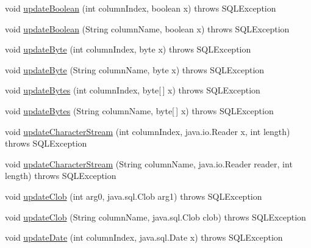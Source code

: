 \begin{DoxyCompactItemize}
void \mbox{\hyperlink{classcom_1_1mysql_1_1cj_1_1jdbc_1_1result_1_1_result_set_impl_a771a72e5c06a9b65546cfbf374addb5d}{update\+Boolean}} (int column\+Index, boolean x)  throws S\+Q\+L\+Exception 
\item 
void \mbox{\hyperlink{classcom_1_1mysql_1_1cj_1_1jdbc_1_1result_1_1_result_set_impl_ae8c78aad2e4078932d6153efecb2632c}{update\+Boolean}} (String column\+Name, boolean x)  throws S\+Q\+L\+Exception 
\item 
void \mbox{\hyperlink{classcom_1_1mysql_1_1cj_1_1jdbc_1_1result_1_1_result_set_impl_ac4d0f449cc4fd29b89f1ceb6b72209ae}{update\+Byte}} (int column\+Index, byte x)  throws S\+Q\+L\+Exception 
\item 
void \mbox{\hyperlink{classcom_1_1mysql_1_1cj_1_1jdbc_1_1result_1_1_result_set_impl_ae8fd5cb7b758693b2db4729b2ffec9ae}{update\+Byte}} (String column\+Name, byte x)  throws S\+Q\+L\+Exception 
\item 
void \mbox{\hyperlink{classcom_1_1mysql_1_1cj_1_1jdbc_1_1result_1_1_result_set_impl_a48efa493f35509f2dabf0b91d8b4a038}{update\+Bytes}} (int column\+Index, byte\mbox{[}$\,$\mbox{]} x)  throws S\+Q\+L\+Exception 
\item 
void \mbox{\hyperlink{classcom_1_1mysql_1_1cj_1_1jdbc_1_1result_1_1_result_set_impl_ada2b7281c3af8825a8ec5350b7c36e20}{update\+Bytes}} (String column\+Name, byte\mbox{[}$\,$\mbox{]} x)  throws S\+Q\+L\+Exception 
\item 
void \mbox{\hyperlink{classcom_1_1mysql_1_1cj_1_1jdbc_1_1result_1_1_result_set_impl_a250abe8a9f81e016d55af6d012771742}{update\+Character\+Stream}} (int column\+Index, java.\+io.\+Reader x, int length)  throws S\+Q\+L\+Exception 
\item 
void \mbox{\hyperlink{classcom_1_1mysql_1_1cj_1_1jdbc_1_1result_1_1_result_set_impl_a16ea8e136afc00de800ef95377d4c589}{update\+Character\+Stream}} (String column\+Name, java.\+io.\+Reader reader, int length)  throws S\+Q\+L\+Exception 
\item 
void \mbox{\hyperlink{classcom_1_1mysql_1_1cj_1_1jdbc_1_1result_1_1_result_set_impl_aa4b5c8494246c94994d1d5b0d54cd5f9}{update\+Clob}} (int arg0, java.\+sql.\+Clob arg1)  throws S\+Q\+L\+Exception 
\item 
void \mbox{\hyperlink{classcom_1_1mysql_1_1cj_1_1jdbc_1_1result_1_1_result_set_impl_ab1756d8c9fb110288e8bf6e44f2f9564}{update\+Clob}} (String column\+Name, java.\+sql.\+Clob clob)  throws S\+Q\+L\+Exception 
\item 
void \mbox{\hyperlink{classcom_1_1mysql_1_1cj_1_1jdbc_1_1result_1_1_result_set_impl_acb874242a77cf3dbba2c0835da174f87}{update\+Date}} (int column\+Index, java.\+sql.\+Date x)  throws S\+Q\+L\+Exception 

\end{DoxyCompactItemize}
